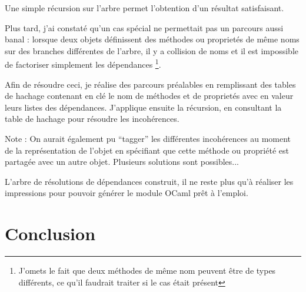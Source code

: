 \documentclass[11pt,a4paper]{report}
\begin{document}
Une simple récursion sur l'arbre permet l'obtention d'un résultat satisfaisant.

Plus tard, j'ai constaté qu'un cas spécial ne permettait pas un parcours aussi banal :
lorsque deux objets définissent des méthodes ou proprietés de même noms sur des branches différentes
de l'arbre, il y a collision de noms et il est impossible de factoriser simplement les dépendances
\footnote{J'omets le fait que deux méthodes de même nom peuvent être de types différents, 
ce qu'il faudrait traiter si le cas était présent}.

Afin de résoudre ceci, je réalise des parcours préalables en remplissant des tables de hachage contenant
en clé le nom de méthodes et de proprietés avec en valeur leurs listes des dépendances.
J'applique ensuite la récursion, en consultant la table de hachage pour résoudre les incohérences.

Note : On aurait également pu ``tagger'' les différentes incohérences au moment de la représentation de l'objet
en spécifiant que cette méthode ou propriété est partagée avec un autre objet. Plusieurs solutions sont
possibles...\medskip

L'arbre de résolutions de dépendances construit, il ne reste plus qu'à réaliser les impressions
pour pouvoir générer le module OCaml prêt à l'emploi.



\chapter{Conclusion}

%
\end{document}
